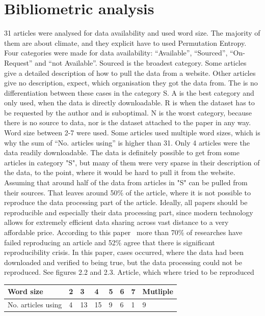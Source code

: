 \section{Bibliometric analysis}
31 articles were analysed for data availability and used word size. The majority of them are about climate, and they explicit have to used Permutation Entropy. Four categories were made for data availability: “Available”, “Sourced”, “On-Request” and “not Available”. Sourced is the broadest category. Some articles give a detailed description of how to pull the data from a website. Other articles give no description, expect, which organisation they got the data from. The is no differentiation between these cases in the category S. A is the best category and only used, when the data is directly downloadable. R is when the dataset has to be requested by the author and is suboptimal. N is the worst category, because there is no source to data, nor is the dataset attached to the paper in any way. Word size between 2-7 were used. Some articles used multiple word sizes, which is why the sum of “No. articles using” is higher than 31. Only 4 articles were the data readily downloadable. The data is definitely possible to get from some articles in category "S", but many of them were very sparse in their description of the data, to the point, where it would be hard to pull it from the website. Assuming that around half of the data from articles in "S" can be pulled from their sources. That leaves around 50\% of the article, where it is not possible to reproduce the data processing part of the article. Ideally, all papers should be reproducible and especially their data processing part, since modern technology allows for extremely efficient data sharing across vast distance to a very affordable price. According to this paper~\cite{Baker2016} more than 70\% of researches have failed reproducing an article and 52\% agree that there is significant reproducibility crisis. In this paper, cases occurred, where the data had been downloaded and verified to being true, but the data processing could not be reproduced. See figures 2.2 and 2.3. Article, which where tried to be reproduced~\cite{Saco2010}


\begin{table}[]
\begin{tabular}{|l|l|l|l|l|l|l|l|}
\hline
Word size & 2 & 3  & 4  & 5 & 6 & 7 & Mutliple \\ \hline
No. articles using  & 4 & 13 & 15 & 9 & 6 & 1 & 9        \\ \hline
\end{tabular}
\end{table}

